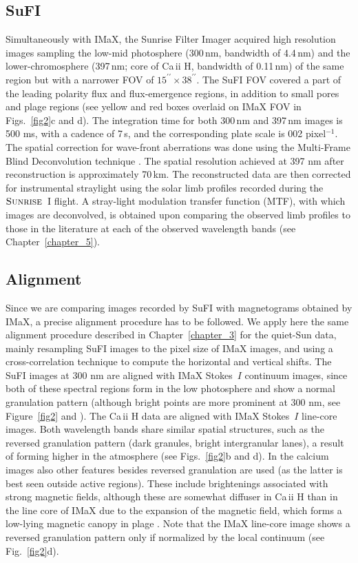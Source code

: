 \documentclass[goettingen, gauss, print]{thesis}
\begin{document}
\subsection{SuFI}
\label{sufi}

Simultaneously with IMaX, the Sunrise Filter Imager \citep[SuFI;][]{gandorfer_filter_2011} acquired high resolution images sampling the low-mid photosphere (300\,nm, bandwidth of 4.4\,nm) and the lower-chromosphere (397\,nm; core of Ca\,{\sc ii} H, bandwidth of 0.11\,nm) of the same region but with a narrower FOV of $15^{\prime\prime}\times38^{\prime\prime}$. The SuFI FOV covered a part of the leading polarity flux and flux-emergence regions, in addition to small pores and plage regions (see yellow and red boxes overlaid on IMaX FOV in Figs.~\ref{fig2}c and d). The integration time for both 300\,nm and 397\,nm images is 500 ms, with a cadence of 7\,s, and the corresponding  plate scale is 0\carcsec{}02 pixel$^{-1}$.
The spatial correction for wave-front aberrations was done using the Multi-Frame Blind Deconvolution technique \citep[MFBD;][]{van_noort_solar_2005}. The spatial resolution achieved at 397 nm after reconstruction is approximately 70\,km.
The reconstructed data are then corrected for instrumental straylight using the solar limb profiles recorded during the $\textsc{Sunrise}$~I flight. A stray-light modulation transfer function (MTF), with which images are deconvolved, is obtained upon comparing the observed limb profiles to those in the literature at each of the observed wavelength bands (see Chapter~\ref{chapter_5}).

\subsection{Alignment}
\label{alignment}
Since we are comparing images recorded by SuFI with magnetograms obtained by IMaX, a precise alignment procedure has to be followed.
We apply here the same alignment procedure described in Chapter~\ref{chapter_3} for the quiet-Sun data, mainly resampling SuFI images to the pixel size of IMaX images, and using a cross-correlation technique to compute the horizontal and vertical shifts. 
The SuFI images at 300 nm are aligned with IMaX Stokes~$I$ continuum images, since both of these spectral regions form in the low photosphere and show a normal granulation pattern (although bright points are more prominent at 300 nm, see Figure~\ref{fig2} and \cite{riethmuller_bright_2010}). The Ca\,{\sc ii} H data are aligned with IMaX Stokes~$I$ line-core images.
Both wavelength bands share similar spatial structures, such as the reversed granulation pattern (dark granules, bright intergranular lanes), a result of forming higher in the atmosphere (see Figs.~\ref{fig2}b and d). In the calcium images also other features besides reversed granulation are used (as the latter is best seen outside active regions). These include brightenings associated with strong magnetic fields, although these are somewhat diffuser in Ca\,{\sc ii} H  than in the line core of IMaX due to the expansion of the magnetic field, which forms a low-lying magnetic canopy in plage \citep{jafarzadeh_high-frequency_2017}. Note that the IMaX line-core image shows a reversed granulation pattern only if normalized by the local continuum (see Fig.~\ref{fig2}d). 
\end{document}
